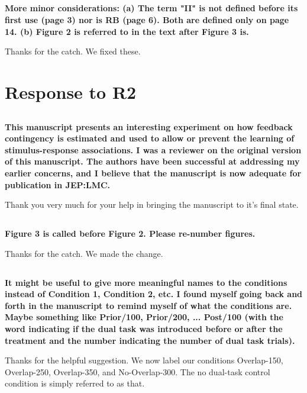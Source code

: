 \documentclass[10pt,a4paper]{article}
\begin{document}
\subsection{} \textbf{More minor considerations: (a) The term "II" is not
  defined before its first use (page 3) nor is RB (page 6). Both are defined only
  on page 14. (b) Figure 2 is referred to in the text after Figure 3 is.
}

Thanks for the catch. We fixed these.

\section{Response to R2}
\subsection{} \textbf{This manuscript presents an interesting experiment on how
  feedback contingency is estimated and used to allow or prevent the learning of
  stimulus-response associations. I was a reviewer on the original version of this
  manuscript. The authors have been successful at addressing my earlier concerns,
  and I believe that the manuscript is now adequate for publication in JEP:LMC.}

Thank you very much for your help in bringing the manuscript to it's final
state.

\subsection{} \textbf{Figure 3 is called before Figure 2. Please re-number figures.}

Thanks for the catch. We made the change.

\subsection{} \textbf{It might be useful to give more meaningful names to the
  conditions instead of Condition 1, Condition 2, etc. I found myself going back
  and forth in the manuscript to remind myself of what the conditions are. Maybe
  something like Prior/100, Prior/200, ... Post/100 (with the word indicating if
  the dual task was introduced before or after the treatment and the number
  indicating the number of dual task trials).}

Thanks for the helpful suggestion. We now label our conditions Overlap-150,
Overlap-250, Overlap-350, and No-Overlap-300. The no dual-task control condition
is simply referred to as that.
\end{document}
